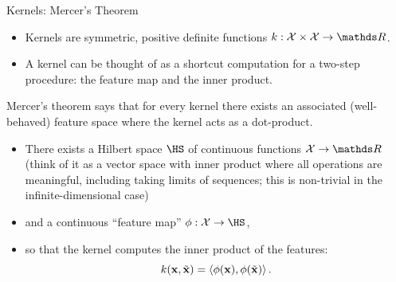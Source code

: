 \documentclass[11pt,compress,t,notes=noshow, xcolor=table]{beamer}
\begin{document}

\begin{vbframe}{Kernels: Mercer's Theorem}
  \begin{itemize}
    \item Kernels are symmetric, positive definite functions
      $k : \Xspace \times \Xspace \to \R$.
   \item A kernel can be thought of as a shortcut computation for a two-step procedure: the feature map and the inner product.
  \end{itemize}

  \lz

  Mercer's theorem says that for every kernel there exists an 
  associated (well-behaved) feature space where the kernel acts as a dot-product.
 

  \lz

  \begin{itemize}
    \item There exists a Hilbert space $\HS$ of continuous
    functions $\Xspace \to \R$
    {\small (think of it as a vector space with inner product
    where all operations are meaningful, including taking limits of
    sequences; this is non-trivial in the infinite-dimensional
    case)}
    \item and a continuous ``feature map'' $\phi : \Xspace \to \HS$,
    \item so that the kernel computes the inner product of the features:
    $$ k(\mathbf{x}, \tilde {\mathbf{x}}) = \left\langle \phi(\mathbf{x}), \phi(\tilde {\mathbf{x}}) \right\rangle.$$
  \end{itemize}

\end{vbframe}
\end{document}
